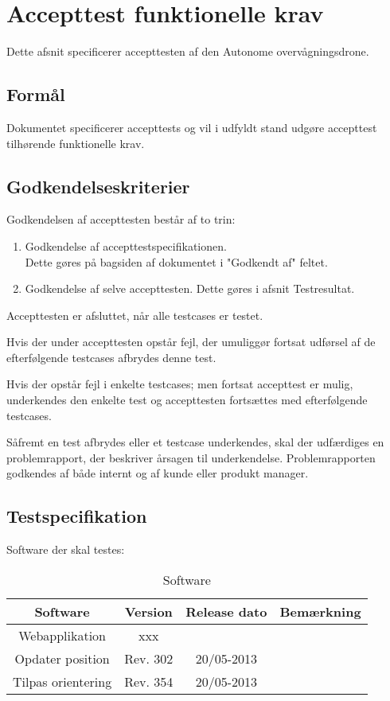 \section{Accepttest funktionelle krav}
Dette afsnit specificerer accepttesten af den Autonome overvågningsdrone.

\subsection*{Formål}
Dokumentet specificerer accepttests og vil i udfyldt stand udgøre accepttest tilhørende funktionelle krav. 

\subsection*{Godkendelseskriterier}
Godkendelsen af accepttesten består af to trin:

\begin{enumerate}
	\item Godkendelse af accepttestspecifikationen. \\
	Dette gøres på bagsiden af dokumentet i "Godkendt af" feltet.

	\item Godkendelse af selve accepttesten. Dette gøres i afsnit Testresultat. 
\end{enumerate}

Accepttesten er afsluttet, når alle testcases er testet.

Hvis der under accepttesten opstår fejl, der umuliggør fortsat udførsel af de efterfølgende testcases afbrydes denne test.

Hvis der opstår fejl i enkelte testcases; men fortsat accepttest er mulig, underkendes den enkelte test og accepttesten fortsættes med efterfølgende testcases.

Såfremt en test afbrydes eller et testcase underkendes, skal der udfærdiges en problemrapport, der beskriver årsagen til underkendelse. Problemrapporten godkendes af både internt og af kunde eller produkt manager.

\newpage

\subsection*{Testspecifikation}
Software der skal testes:
\begin{table}[H]
	\centering
		\begin{tabular}{|c|c|c|c|}
			\hline
			Software & Version & Release dato & Bemærkning \\ \hline
			Webapplikation & xxx & &\\ \hline
			Opdater position & Rev. 302 & 20/05-2013 & \\ \hline
			Tilpas orientering & Rev. 354 & 20/05-2013 & \\ \hline
		\end{tabular}
	\caption{Software}
\end{table}

